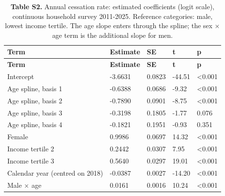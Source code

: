 \footnotesize
\begin{longtable}{lllll}
\caption{\textbf{Table S2.} Annual cessation rate: estimated coefficients (logit scale), continuous household survey 2011-2025. Reference categories: male, lowest income tertile. The age slope enters through the spline; the sex × age term is the additional slope for men.}\\
\toprule
\textbf{Term} & \textbf{Estimate} & \textbf{SE} & \textbf{t} & \textbf{p} \\
\midrule
\endfirsthead
\toprule
\textbf{Term} & \textbf{Estimate} & \textbf{SE} & \textbf{t} & \textbf{p} \\
\midrule
\endhead
\bottomrule
\endfoot
Intercept & -3.6631 & 0.0823 & -44.51 & <0.001 \\
Age spline, basis 1 & -0.6388 & 0.0686 & -9.32 & <0.001 \\
Age spline, basis 2 & -0.7890 & 0.0901 & -8.75 & <0.001 \\
Age spline, basis 3 & -0.3198 & 0.1805 & -1.77 & 0.076 \\
Age spline, basis 4 & -0.1821 & 0.1951 & -0.93 & 0.351 \\
Female & 0.9986 & 0.0697 & 14.32 & <0.001 \\
Income tertile 2 & 0.2442 & 0.0307 & 7.95 & <0.001 \\
Income tertile 3 & 0.5640 & 0.0297 & 19.01 & <0.001 \\
Calendar year (centred on 2018) & -0.0387 & 0.0027 & -14.20 & <0.001 \\
Male × age & 0.0161 & 0.0016 & 10.24 & <0.001 \\
\end{longtable}
\normalsize
